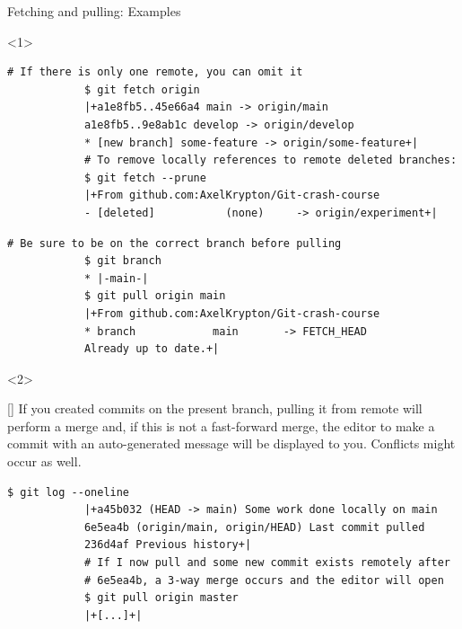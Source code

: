 \documentclass[usenames,svgnames,14pt]{beamer}
\begin{document}
\begin{frame}[fragile]{Fetching and pulling: Examples}
    \begin{onlyenv}<1>
        \begin{lstlisting}[style=MyBash]
            # If there is only one remote, you can omit it
            $ git fetch origin
            |+a1e8fb5..45e66a4 main -> origin/main
            a1e8fb5..9e8ab1c develop -> origin/develop
            * [new branch] some-feature -> origin/some-feature+|
            # To remove locally references to remote deleted branches:
            $ git fetch --prune
            |+From github.com:AxelKrypton/Git-crash-course
            - [deleted]           (none)     -> origin/experiment+|
        \end{lstlisting}
        \begin{lstlisting}[style=MyBash]
            # Be sure to be on the correct branch before pulling
            $ git branch
            * |-main-|
            $ git pull origin main
            |+From github.com:AxelKrypton/Git-crash-course
            * branch            main       -> FETCH_HEAD
            Already up to date.+|
        \end{lstlisting}
    \end{onlyenv}
    \begin{onlyenv}<2>
        \begin{varblock}{}[\textwidth]{}
            If you created commits on the present branch, pulling it from remote will perform a merge and, if this is not a fast-forward merge, the editor to make a commit with an auto-generated message will be displayed to you. \alert{Conflicts might occur as well.}
        \end{varblock}
        \begin{lstlisting}[style=MyBash]
            $ git log --oneline
            |+a45b032 (HEAD -> main) Some work done locally on main
            6e5ea4b (origin/main, origin/HEAD) Last commit pulled
            236d4af Previous history+|
            # If I now pull and some new commit exists remotely after
            # 6e5ea4b, a 3-way merge occurs and the editor will open
            $ git pull origin master
            |+[...]+|
        \end{lstlisting}
    \end{onlyenv}
\end{frame}
\end{document}
